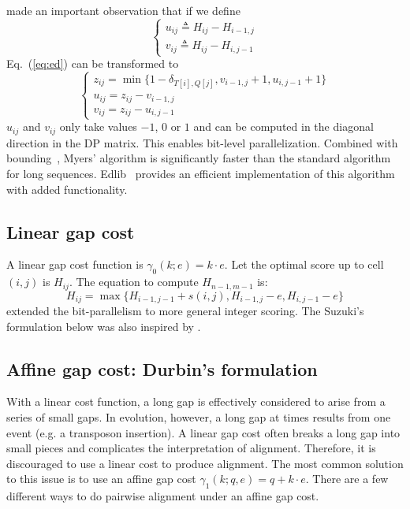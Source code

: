 \documentclass{bioinfo}
\begin{document}
\citet{Myers:1999aa} made an important observation that if we define
\[\left\{\begin{array}{l}
u_{ij}\triangleq H_{ij}-H_{i-1,j}\\
v_{ij}\triangleq H_{ij}-H_{i,j-1}
\end{array}\right.\]
Eq.~(\ref{eq:ed}) can be transformed to
\begin{equation}
\left\{\begin{array}{l}
z_{ij}=\min\{1-\delta_{T[i],Q[j]},v_{i-1,j}+1,u_{i,j-1}+1\}\\
u_{ij}=z_{ij}-v_{i-1,j}\\
v_{ij}=z_{ij}-u_{i,j-1}
\end{array}\right.
\end{equation}
$u_{ij}$ and $v_{ij}$ only take values $-1$, $0$ or $1$ and can be computed in
the diagonal direction in the DP matrix. This enables bit-level
parallelization. Combined with bounding~\citep{Ukkonen:1985aa}, Myers'
algorithm is significantly faster than the standard algorithm for long
sequences. Edlib~\citep{Sosic:2017aa} provides an efficient implementation of
this algorithm with added functionality.

\subsection{Linear gap cost}

A linear gap cost function is $\gamma_0(k;e)=k\cdot e$. Let the optimal score up
to cell $(i,j)$ is $H_{ij}$. The equation to compute $H_{n-1,m-1}$ is:
\begin{equation}\label{eq:linear}
H_{ij}=\max\{H_{i-1,j-1}+s(i,j), H_{i-1,j}-e, H_{i,j-1}-e\}
\end{equation}
\citet{Loving:2014aa} extended the bit-parallelism to more general integer
scoring. The Suzuki's formulation below was also inspired by
\citet{Myers:1999aa}.

\subsection{Affine gap cost: Durbin's formulation}

With a linear cost function, a long gap is effectively considered to arise from
a series of small gaps. In evolution, however, a long gap at times results from
one event (e.g. a transposon insertion). A linear gap cost often breaks a long
gap into small pieces and complicates the interpretation of alignment.
Therefore, it is discouraged to use a linear cost to produce alignment. The
most common solution to this issue is to use an affine gap cost
$\gamma_1(k;q,e)=q+k\cdot e$. There are a few different ways to do pairwise
alignment under an affine gap cost.
\end{document}

